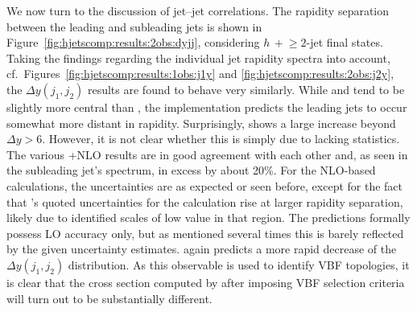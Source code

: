 We now turn to the discussion of jet--jet correlations.
The rapidity separation between the leading and subleading jets is
shown in Figure~\ref{fig:hjetscomp:results:2obs:dyjj}, considering
$h\,+\!\ge\!2$-jet final states. Taking the findings regarding the
individual jet rapidity spectra into account,
cf.~Figures~\ref{fig:hjetscomp:results:1obs:j1y} and
\ref{fig:hjetscomp:results:2obs:j2y}, the $\Delta y(j_1,j_2)$ results
are found to behave very similarly. While \Sherpa \NNLOPS and \MGaMC
tend to be slightly more central than \Powheg, the \Sherpa \MEPSatNLO
implementation predicts the leading jets to occur somewhat more
distant in rapidity. Surprisingly, \Herwig shows a large increase 
beyond $\Delta y>6$. However, it is not clear whether this is simply
due to lacking statistics. The various \GoSam{}+\Sherpa NLO results
are in good agreement with each other and, as seen in the subleading
jet's spectrum, in excess by about 20\%. For the NLO-based
calculations, the uncertainties are as expected or seen before, except
for the fact that \Sherpa's quoted uncertainties for the \MEPSatNLO
calculation rise at larger rapidity separation, likely due to
identified scales of low value in that region. The \NNLOPS predictions
formally possess LO accuracy only, but as mentioned several times this is
barely reflected by the given uncertainty estimates. \Hej again
predicts a more rapid decrease of the $\Delta y(j_1,j_2)$
distribution. As this observable is used to identify VBF topologies,
it is clear that the cross section computed by \Hej after imposing VBF
selection criteria will turn out to be substantially different.

